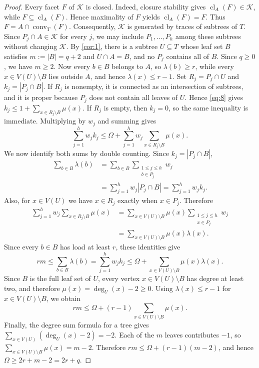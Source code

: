 \documentclass[11pt]{amsart}
\theoremstyle{definition}
\newcommand{\cl}{\operatorname{cl}}
\newcommand{\conv}{\operatorname{conv}}
\begin{document}
\begin{proof}
Every facet $F$ of $\mathcal K$ is closed. Indeed, closure stability gives $\cl_A(F)\in\mathcal K$, while $F\subseteq\cl_A(F)$. Hence maximality of $F$ yields $\cl_A(F)=F$. Thus $F=A\cap\conv_T(F)$. Consequently, $\mathcal K$ is generated by traces of subtrees of $T$. Since $P_j\cap A\in\mathcal K$ for every $j$, we may include $P_1,\dots,P_h$ among these subtrees without changing $\mathcal K$. By \cref{cor:1}, there is a subtree $U\subseteq T$ whose leaf set $B$ satisfies $m:=|B|=q+2$ and $U\cap A=B$, and no $P_j$ contains all of $B$. Since $q\ge0$, we have $m\ge2$. Now every $b\in B$ belongs to $A$, so $\lambda(b)\ge r$, while every $x\in V(U)\setminus B$ lies outside $A$, and hence $\lambda(x)\le r-1$. Set $R_j=P_j\cap U$ and $k_j=|P_j\cap B|$. If $R_j$ is nonempty, it is connected as an intersection of subtrees, and it is proper because $P_j$ does not contain all leaves of $U$. Hence \cref{eq:8} gives $k_j\le1+\sum_{x\in R_j\setminus B}\mu(x)$. If $R_j$ is empty, then $k_j=0$, so the same inequality is immediate. Multiplying by $w_j$ and summing gives
\[
\sum_{j=1}^h w_jk_j
\le \Omega+
\sum_{j=1}^h w_j\sum_{x\in R_j\setminus B}\mu(x).
\]
We now identify both sums by double counting. Since $k_j=|P_j\cap B|$,
\[
\begin{aligned}
\sum_{b\in B}\lambda(b)
&=\sum_{b\in B}\sum_{\substack{1\le j\le h\\ b\in P_j}}w_j\\
&=\sum_{j=1}^h w_j|P_j\cap B|
 =\sum_{j=1}^h w_jk_j.
\end{aligned}
\]
Also, for $x\in V(U)$ we have $x\in R_j$ exactly when $x\in P_j$. Therefore
\[
\begin{aligned}
\sum_{j=1}^h w_j\sum_{x\in R_j\setminus B}\mu(x)
&=\sum_{x\in V(U)\setminus B}\mu(x)
  \sum_{\substack{1\le j\le h\\ x\in P_j}}w_j\\
&=\sum_{x\in V(U)\setminus B}\mu(x)\lambda(x).
\end{aligned}
\]
Since every $b\in B$ has load at least $r$, these identities give
\[
rm
\le \sum_{b\in B}\lambda(b)
=\sum_{j=1}^h w_jk_j
\le \Omega+
\sum_{x\in V(U)\setminus B}\mu(x)\lambda(x).
\]
Since $B$ is the full leaf set of $U$, every vertex $x\in V(U)\setminus B$ has degree at least two, and therefore $\mu(x)=\deg_U(x)-2\ge0$. Using $\lambda(x)\le r-1$ for $x\in V(U)\setminus B$, we obtain
\[
rm\le\Omega+(r-1)
\sum_{x\in V(U)\setminus B}\mu(x).
\]
Finally, the degree sum formula for a tree gives $\sum_{x\in V(U)}(\deg_U(x)-2)=-2$. Each of the $m$ leaves contributes $-1$, so $\sum_{x\in V(U)\setminus B}\mu(x)=m-2$. Therefore $rm\le\Omega+(r-1)(m-2)$, and hence $\Omega\ge2r+m-2=2r+q$.
\end{proof}
\end{document}
